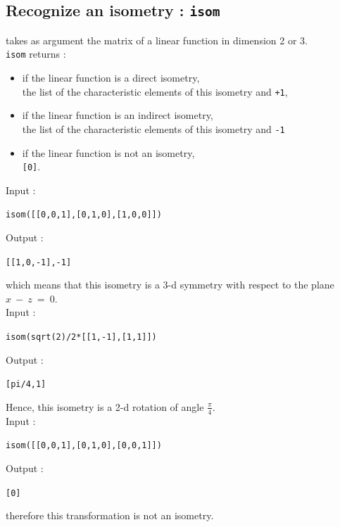 \documentclass[a4paper,11pt]{book}
\begin{document}
\subsection{Recognize an isometry : {\tt isom}}
 takes as argument the matrix of a linear
function in dimension 2 or 3.\\
{\tt isom} returns :
\begin{itemize}
\item  
if the linear function is a direct isometry,\\
the list of the characteristic elements of this isometry and {\tt +1},
\item if the linear function is an indirect isometry,\\
the list of the characteristic elements of this isometry and {\tt -1} 
\item if the linear function is not an isometry,\\
{\tt [0]}.
\end{itemize}
Input :
\begin{center}{\tt isom([[0,0,1],[0,1,0],[1,0,0]])}\end{center}
Output :
\begin{center}{\tt  [[1,0,-1],-1]}\end{center}
which means that this isometry is a 3-d symmetry with respect to the plane 
$x\ -\ z\ =\ 0$.\\ 
Input :
\begin{center}{\tt isom(sqrt(2)/2*[[1,-1],[1,1]])}\end{center}
Output :
\begin{center}{\tt [pi/4,1]}\end{center}
Hence, this isometry is a 2-d rotation of angle 
$\displaystyle \frac{\pi}{4}$.\\
Input :
\begin{center}{\tt isom([[0,0,1],[0,1,0],[0,0,1]])}\end{center}
Output :
\begin{center}{\tt [0]}\end{center}
therefore this transformation is not an isometry.
\end{document}
